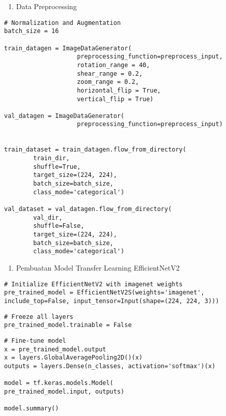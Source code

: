 \begin{enumerate}[label=\alph*., start=3]
    \item Data Preprocessing
\end{enumerate}

\begin{lstlisting}[style=customc]
# Normalization and Augmentation
batch_size = 16

train_datagen = ImageDataGenerator(
                    preprocessing_function=preprocess_input,
                    rotation_range = 40,
                    shear_range = 0.2,
                    zoom_range = 0.2,
                    horizontal_flip = True,
                    vertical_flip = True)

val_datagen = ImageDataGenerator(
                    preprocessing_function=preprocess_input)


train_dataset = train_datagen.flow_from_directory(
        train_dir,
        shuffle=True,
        target_size=(224, 224),
        batch_size=batch_size,
        class_mode='categorical')

val_dataset = val_datagen.flow_from_directory(
        val_dir,
        shuffle=False,
        target_size=(224, 224),
        batch_size=batch_size,
        class_mode='categorical')
\end{lstlisting}

\begin{enumerate}[label=\alph*., start=4]
    \item Pembuatan Model Transfer Learning EfficientNetV2
\end{enumerate}

\begin{lstlisting}[style=customc]
# Initialize EfficientNetV2 with imagenet weights
pre_trained_model = EfficientNetV2S(weights='imagenet', 
include_top=False, input_tensor=Input(shape=(224, 224, 3)))
\end{lstlisting}

\begin{lstlisting}[style=customc]
# Freeze all layers
pre_trained_model.trainable = False
\end{lstlisting}

\begin{lstlisting}[style=customc]
# Fine-tune model
x = pre_trained_model.output
x = layers.GlobalAveragePooling2D()(x)
outputs = layers.Dense(n_classes, activation='softmax')(x)

model = tf.keras.models.Model(
pre_trained_model.input, outputs)

model.summary()
\end{lstlisting}

